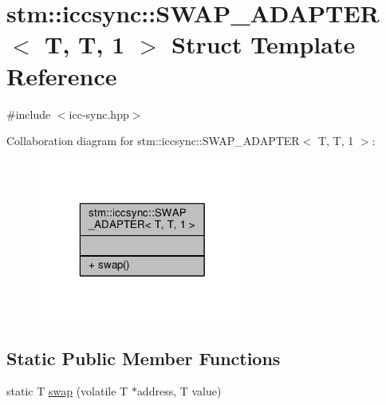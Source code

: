 \hypertarget{structstm_1_1iccsync_1_1SWAP__ADAPTER_3_01T_00_01T_00_011_01_4}{\section{stm\-:\-:iccsync\-:\-:S\-W\-A\-P\-\_\-\-A\-D\-A\-P\-T\-E\-R$<$ T, T, 1 $>$ Struct Template Reference}
\label{structstm_1_1iccsync_1_1SWAP__ADAPTER_3_01T_00_01T_00_011_01_4}
}


{\ttfamily \#include $<$icc-\/sync.\-hpp$>$}



Collaboration diagram for stm\-:\-:iccsync\-:\-:S\-W\-A\-P\-\_\-\-A\-D\-A\-P\-T\-E\-R$<$ T, T, 1 $>$\-:
\nopagebreak
\begin{figure}[H]
\begin{center}
\leavevmode
\includegraphics[width=196pt]{structstm_1_1iccsync_1_1SWAP__ADAPTER_3_01T_00_01T_00_011_01_4__coll__graph}
\end{center}
\end{figure}
\subsection*{Static Public Member Functions}
\begin{DoxyCompactItemize}
\item 
static T \hyperlink{structstm_1_1iccsync_1_1SWAP__ADAPTER_3_01T_00_01T_00_011_01_4_ab4751612053d227dde4bd73befaef86a}{swap} (volatile T $\ast$address, T value)
\end{DoxyCompactItemize}


